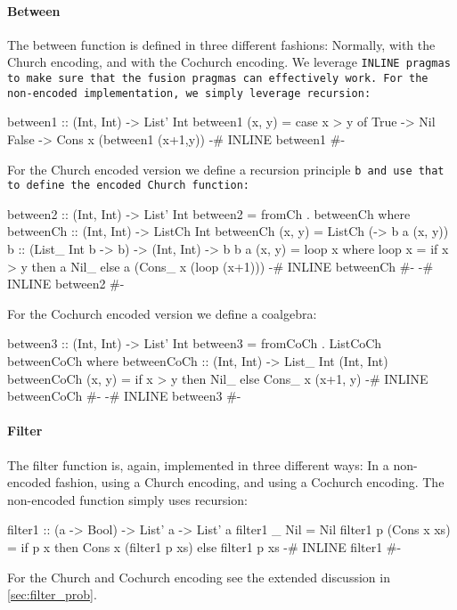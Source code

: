 \paragraph{Between}
The between function is defined in three different fashions: Normally, with the Church encoding, and with the Cochurch encoding.
We leverage \tt{INLINE} pragmas to make sure that the fusion pragmas can effectively work.
For the non-encoded implementation, we simply leverage recursion:
\begin{code}
between1 :: (Int, Int) -> List' Int
between1 (x, y) = case x > y of
  True  -> Nil
  False -> Cons x (between1 (x+1,y))
{-# INLINE between1 #-}
\end{code}
For the Church encoded version we define a recursion principle \tt{b} and use that to define the encoded Church function:
\begin{code}
between2 :: (Int, Int) -> List' Int
between2 = fromCh . betweenCh
  where betweenCh :: (Int, Int) -> ListCh Int
        betweenCh (x, y) = ListCh (\a -> b a (x, y))
        b :: (List_ Int b -> b) -> (Int, Int) -> b
        b a (x, y) = loop x
          where loop x = if x > y
                         then a Nil_
                         else a (Cons_ x (loop (x+1)))
        {-# INLINE betweenCh #-}
{-# INLINE between2 #-}
\end{code}
For the Cochurch encoded version we define a coalgebra:
\begin{code}
between3 :: (Int, Int) -> List' Int
between3 = fromCoCh . ListCoCh betweenCoCh
  where betweenCoCh :: (Int, Int) -> List_ Int (Int, Int)
        betweenCoCh (x, y) = if x > y 
                             then Nil_
                             else Cons_ x (x+1, y)
        {-# INLINE betweenCoCh #-}
{-# INLINE between3 #-}
\end{code}
\paragraph{Filter}

The filter function is, again, implemented in three different ways:
In a non-encoded fashion, using a Church encoding, and using a Cochurch encoding.
The non-encoded function simply uses recursion:
\begin{code}
filter1 :: (a -> Bool) -> List' a -> List' a
filter1 _ Nil = Nil
filter1 p (Cons x xs) = if p x then Cons x (filter1 p xs) else filter1 p xs
{-# INLINE filter1 #-}
\end{code}
For the Church and Cochurch encoding see the extended discussion in \autoref{sec:filter_prob}.

